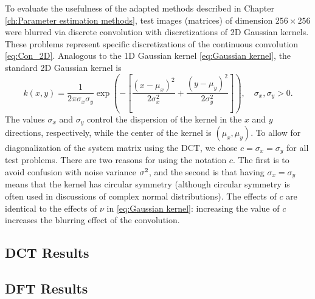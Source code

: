 To evaluate the usefulness of the adapted methods described in Chapter \ref{ch:Parameter estimation methods}, test images (matrices) of dimension $256 \times 256$ were blurred via discrete convolution with discretizations of 2D Gaussian kernels. These problems represent specific discretizations of the continuous convolution \eqref{eq:Con_2D}. Analogous to the 1D Gaussian kernel \eqref{eq:Gaussian kernel}, the standard 2D Gaussian kernel is
\begin{equation}
    \label{eq:2D Gaussian kernel}
    k(x,y) = \frac{1}{2\pi\sigma_x\sigma_y}\exp\left(-\left[\frac{(x-\mu_x)^2}{2\sigma_x^2} + \frac{(y-\mu_y)^2}{2\sigma_y^2}\right]\right), \quad \sigma_x, \sigma_y > 0.
\end{equation}
The values $\sigma_x$ and $\sigma_y$ control the dispersion of the kernel in the $x$ and $y$ directions, respectively, while the center of the kernel is $(\mu_x,\mu_y)$. To allow for diagonalization of the system matrix using the DCT, we chose $c = \sigma_x = \sigma_y$ for all test problems. There are two reasons for using the notation $c$. The first is to avoid confusion with noise variance $\sigma^2$, and the second is that having $\sigma_x = \sigma_y$ means that the kernel has circular symmetry (although circular symmetry is often used in discussions of complex normal distributions). The effects of $c$ are identical to the effects of $\nu$ in \eqref{eq:Gaussian kernel}: increasing the value of $c$ increases the blurring effect of the convolution.

\subsection{DCT Results} \label{sec:DCT}

\subsection{DFT Results} \label{sec:DFT}

